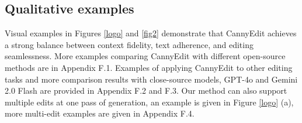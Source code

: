 \documentclass{article}
\begin{document}






\subsection{Qualitative examples}

Visual examples in Figures \ref{logo} and \ref{fig2} demonstrate that CannyEdit achieves a strong balance between context fidelity, text adherence, and editing seamlessness. More examples comparing CannyEdit with different open-source methods are in Appendix F.1. Examples of applying CannyEdit to other editing tasks and more comparison results with close-source models, GPT-4o \citep{OpenAI2025Introducing4O} and Gemini 2.0 Flash \citep{google_gemini2025} are provided in Appendix F.2 and F.3. Our method can also support multiple edits at one pass of generation, an example is given in Figure \ref{logo} (a), more multi-edit examples are given in Appendix F.4.  
\end{document}
